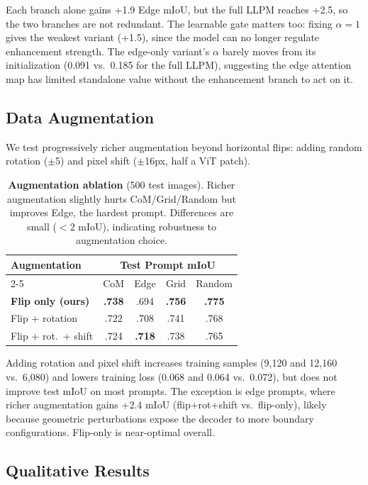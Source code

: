 Each branch alone gains +1.9 Edge mIoU, but the full LLPM reaches +2.5, so the two branches are not redundant. The learnable gate matters too: fixing $\alpha\!=\!1$ gives the weakest variant (+1.5), since the model can no longer regulate enhancement strength. The edge-only variant's $\alpha$ barely moves from its initialization (0.091 vs.\ 0.185 for the full LLPM), suggesting the edge attention map has limited standalone value without the enhancement branch to act on it.

\subsection{Data Augmentation}

We test progressively richer augmentation beyond horizontal flips: adding random rotation ($\pm$5\textdegree) and pixel shift ($\pm$16px, half a ViT patch).

\begin{table}[t]
\centering
\caption{\textbf{Augmentation ablation} (500 test images). Richer augmentation slightly hurts CoM/Grid/Random but improves Edge, the hardest prompt. Differences are small ($<$2 mIoU), indicating robustness to augmentation choice.}
\label{tab:ablation_aug}
\small
\begin{tabular}{lcccc}
\toprule
\multirow{2}{*}{Augmentation} & \multicolumn{4}{c}{Test Prompt mIoU} \\
\cmidrule(lr){2-5}
 & CoM & Edge & Grid & Random \\
\midrule
\textbf{Flip only (ours)} & \textbf{.738} & .694 & \textbf{.756} & \textbf{.775} \\
Flip + rotation & .722 & .708 & .741 & .768 \\
Flip + rot.\ + shift & .724 & \textbf{.718} & .738 & .765 \\
\bottomrule
\end{tabular}
\end{table}

Adding rotation and pixel shift increases training samples (9,120 and 12,160 vs.\ 6,080) and lowers training loss (0.068 and 0.064 vs.\ 0.072), but does not improve test mIoU on most prompts. The exception is edge prompts, where richer augmentation gains +2.4 mIoU (flip+rot+shift vs.\ flip-only), likely because geometric perturbations expose the decoder to more boundary configurations. Flip-only is near-optimal overall.

\subsection{Qualitative Results}

